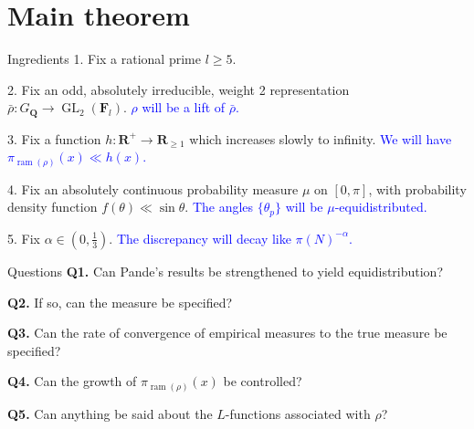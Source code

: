 \documentclass{beamer}
\DeclareMathOperator{\GL}{GL}
\DeclareMathOperator{\ram}{ram}
\newcommand{\bF}{\mathbf{F}}
\newcommand{\bQ}{\mathbf{Q}}
\newcommand{\bR}{\mathbf{R}}
\begin{document}
\section{Main theorem}

\begin{frame}{Ingredients}
1. Fix a rational prime $l\geqslant 5$. 
\pause

2. Fix an odd, absolutely irreducible, weight 2 representation 
$\bar\rho\colon G_\bQ \to \GL_2(\bF_l)$.
\pause
\textcolor{blue}{$\rho$ will be a lift of $\bar\rho$.}
\pause

3. Fix a function $h\colon \bR^+ \to \bR_{\geqslant 1}$ which increases slowly 
to infinity. 
\pause
\textcolor{blue}{We will have $\pi_{\ram(\rho)}(x) \ll h(x)$.}
\pause

4. Fix an absolutely continuous probability measure $\mu$ on $[0,\pi]$, with 
probability density function $f(\theta)\ll \sin\theta$.
\pause
\textcolor{blue}{The angles $\{\theta_p\}$ will be $\mu$-equidistributed.}
\pause

5. Fix $\alpha\in \left(0,\frac 1 3\right)$. 
\pause
\textcolor{blue}{The discrepancy will decay like $\pi(N)^{-\alpha}$.}
\end{frame}



\begin{frame}{Questions}
\textbf{Q1.} Can Pande's results be strengthened to yield equidistribution? 

\textbf{Q2.} If so, can the measure be specified?

\textbf{Q3.} Can the rate of convergence of empirical measures to the true measure 
be specified?

\textbf{Q4.} Can the growth of $\pi_{\ram(\rho)}(x)$ be controlled?

\textbf{Q5.} Can anything be said about the $L$-functions associated with $\rho$?
\end{frame}
\end{document}

